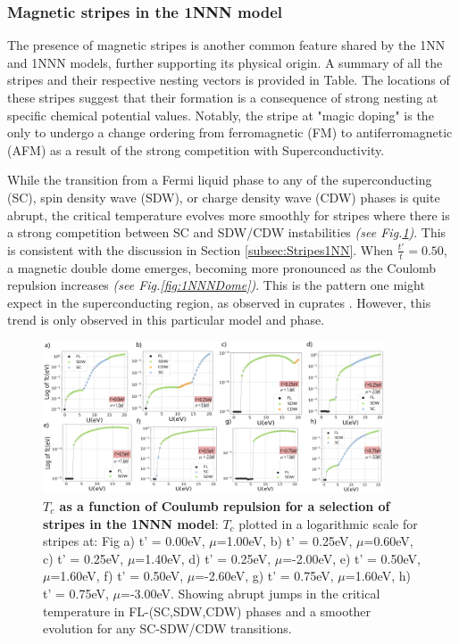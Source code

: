 \documentclass[12pt]{article}
\begin{document}
\subsubsection{Magnetic stripes in the 1NNN model}
\label{subsec:Stripes1NNN}

The presence of magnetic stripes is another common feature shared by the 1NN and 1NNN models, 
further supporting its physical origin.
A summary of all the stripes and their respective nesting vectors is provided 
in Table. The locations of these
stripes suggest that their formation is a consequence of strong nesting at specific 
chemical potential values. 
Notably, the stripe at "magic doping" is the only to undergo a change ordering from ferromagnetic (FM) 
to antiferromagnetic (AFM) as a result of the strong competition with Superconductivity. 



\medskip 

\noindent While the transition from a Fermi liquid phase to any of the superconducting (SC), spin density wave (SDW), or charge density wave (CDW) phases is quite abrupt, the critical temperature
evolves more smoothly for stripes where there is a strong competition between SC and SDW/CDW instabilities \textit{(see Fig.\ref{fig:1NNNStripes})}. 
This is consistent with the discussion in Section \ref{subsec:Stripes1NN}. When $\frac{t'}{t} = 0.50$, a magnetic double dome emerges, becoming more pronounced as the Coulomb repulsion increases \textit{(see Fig.\ref{fig:1NNNDome})}. 
This is the pattern one might expect in the superconducting region, as observed in cuprates \cite{taillefer2010scattering}. 
However, this trend is only observed in this particular model and phase.

\begin{figure}[htbp]  %
    \centering
    \includegraphics[width=0.90\textwidth]{1NNNstripes.png}  %
    \caption{\textbf{$T_c$ as a function of Coulumb repulsion for a selection of stripes in the 1NNN model}: $T_c$ plotted in
    a logarithmic scale for stripes at:  Fig a) t' = 0.00eV, $\mu$=1.00eV, b) t' = 0.25eV, $\mu$=0.60eV, c) t' = 0.25eV, $\mu$=1.40eV,
    d) t' = 0.25eV, $\mu$=-2.00eV,
    e) t' = 0.50eV, $\mu$=1.60eV,
    f) t' = 0.50eV, $\mu$=-2.60eV,
    g) t' = 0.75eV, $\mu$=1.60eV, 
    h) t' = 0.75eV, $\mu$=-3.00eV.
    Showing abrupt jumps in the critical temperature in FL-(SC,SDW,CDW) phases and a smoother
    evolution for any SC-SDW/CDW transitions.  }
    \label{fig:1NNNStripes}
\end{figure}
\end{document}
